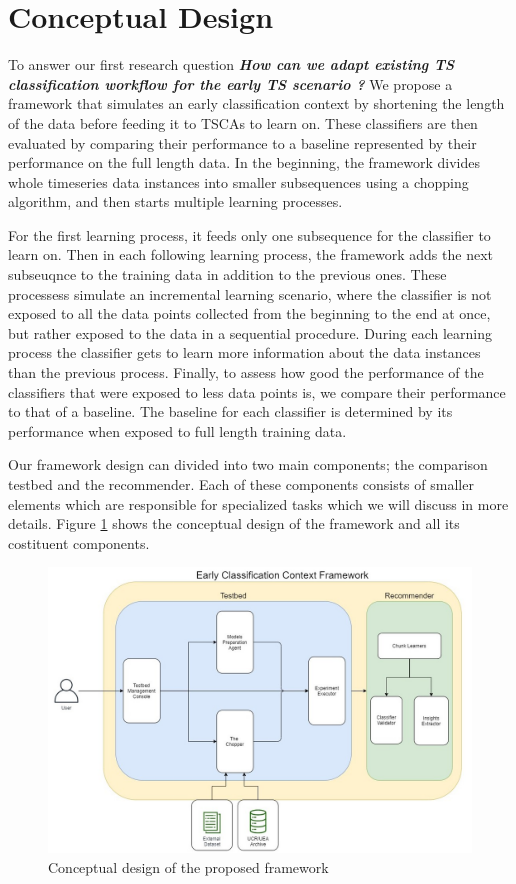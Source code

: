 \section{Conceptual Design}
\label{SectionConceptualDesign}
To answer our first research question \textbf{\textit{How can we adapt existing TS classification workflow for the early TS scenario ?}}
We propose a framework that simulates an early classification context by shortening the length of the data before feeding it to TSCAs to learn on.
These classifiers are then evaluated by comparing their performance to a baseline represented by their performance on the full length data.
In the beginning, the framework divides whole timeseries data instances into smaller subsequences using a chopping algorithm, and then starts multiple learning processes.

For the first learning process, it feeds only one subsequence for the classifier to learn on.
Then in each following learning process, the framework adds the next subseuqnce to the training data in addition to the previous ones.
These processess simulate an incremental learning scenario, where the classifier is not exposed to all the data points collected from the beginning to the end at once, but rather exposed to the data in a sequential procedure.
During each learning process the classifier gets to learn more information about the data instances than the previous process.
Finally, to assess how good the performance of the classifiers that were exposed to less data points is, we compare their performance to that of a baseline.
The baseline for each classifier is determined by its performance when exposed to full length training data.

Our framework design can divided into two main components; the comparison testbed and the recommender.
Each of these components consists of smaller elements which are responsible for specialized tasks which we will discuss in more details.
Figure \ref{Img:ConceptualDesign} shows the conceptual design of the framework and all its costituent components.

\begin{figure}[!htbp]
  \captionsetup{justification=raggedright}
  \centering
  \includegraphics[width=\textwidth]{Framework Diagram.jpg}
  \centering
  \caption{Conceptual design of the proposed framework}
  \label{Img:ConceptualDesign}
\end{figure}

